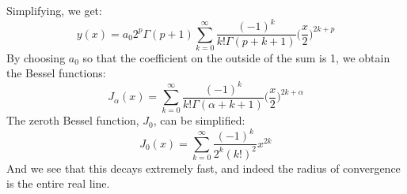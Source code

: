 \documentclass[crop=false,class=book,oneside]{standalone}
\begin{document}
        Simplifying, we get:
        \begin{equation}
            y(x)=a_{0}2^{p}\Gamma(p+1)\sum_{k=0}^{\infty}
                \frac{(\minus{1})^{k}}{k!\Gamma(p+k+1)}
                \Big(\frac{x}{2}\Big)^{2k+p}
        \end{equation}
        By choosing $a_{0}$ so that the coefficient on the outside
        of the sum is 1, we obtain the Bessel functions:
        \begin{equation}
            J_{\alpha}(x)=\sum_{k=0}^{\infty}
            \frac{(\minus{1})^{k}}{k!\Gamma(\alpha+k+1)}
                \Big(\frac{x}{2}\Big)^{2k+\alpha}
        \end{equation}
        The zeroth Bessel function, $J_{0}$, can be simplified:
        \begin{equation}
            J_{0}(x)=\sum_{k=0}^{\infty}
                \frac{(\minus{1})^{k}}{2^{k}(k!)^{2}}x^{2k}
        \end{equation}
        And we see that this decays extremely fast, and indeed the
        radius of convergence is the entire real line.
\end{document}
